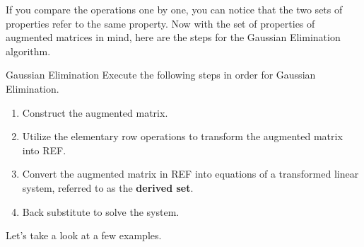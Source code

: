 \documentclass[../../main.tex]{subfiles}
\begin{document}
If you compare the operations one by one, you can notice that the
two sets of properties refer to the same property. Now with the
set of properties of augmented matrices in mind, here are the steps
for the Gaussian Elimination algorithm.

\begin{theorem}{}{Gaussian Elimination}
Execute the following steps in order for Gaussian Elimination.
\begin{enumerate}[noitemsep]
\item
Construct the augmented matrix.
\item
Utilize the elementary row operations to transform the augmented
matrix into REF.
\item
Convert the augmented matrix in REF into equations of a transformed
linear system, referred to as the \textbf{derived set}.
\item
Back substitute to solve the system.
\end{enumerate}
\end{theorem}

Let's take a look at a few examples.
\end{document}
